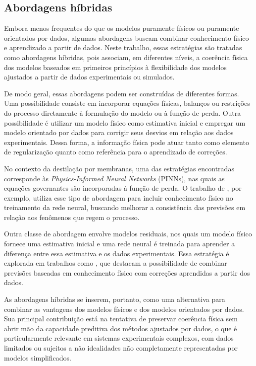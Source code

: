 \subsection{Abordagens híbridas}

Embora menos frequentes do que os modelos puramente físicos ou puramente orientados por dados, algumas abordagens buscam combinar conhecimento físico e aprendizado a partir de dados. Neste trabalho, essas estratégias são tratadas como abordagens híbridas, pois associam, em diferentes níveis, a coerência física dos modelos baseados em primeiros princípios à flexibilidade dos modelos ajustados a partir de dados experimentais ou simulados.

De modo geral, essas abordagens podem ser construídas de diferentes formas. Uma possibilidade consiste em incorporar equações físicas, balanços ou restrições do processo diretamente à formulação do modelo ou à função de perda. Outra possibilidade é utilizar um modelo físico como estimativa inicial e empregar um modelo orientado por dados para corrigir seus desvios em relação aos dados experimentais. Dessa forma, a informação física pode atuar tanto como elemento de regularização quanto como referência para o aprendizado de correções.

No contexto da destilação por membranas, uma das estratégias encontradas corresponde às \textit{Physics-Informed Neural Networks} (PINNs), nas quais as equações governantes são incorporadas à função de perda. O trabalho de \cite{PINN_MD}, por exemplo, utiliza esse tipo de abordagem para incluir conhecimento físico no treinamento da rede neural, buscando melhorar a consistência das previsões em relação aos fenômenos que regem o processo.

Outra classe de abordagem envolve modelos residuais, nos quais um modelo físico fornece uma estimativa inicial e uma rede neural é treinada para aprender a diferença entre essa estimativa e os dados experimentais. Essa estratégia é explorada em trabalhos como \cite{Zhou2024, zheng2021knowledge}, que destacam a possibilidade de combinar previsões baseadas em conhecimento físico com correções aprendidas a partir dos dados.

As abordagens híbridas se inserem, portanto, como uma alternativa para combinar as vantagens dos modelos físicos e dos modelos orientados por dados. Sua principal contribuição está na tentativa de preservar coerência física sem abrir mão da capacidade preditiva dos métodos ajustados por dados, o que é particularmente relevante em sistemas experimentais complexos, com dados limitados ou sujeitos a não idealidades não completamente representadas por modelos simplificados.

